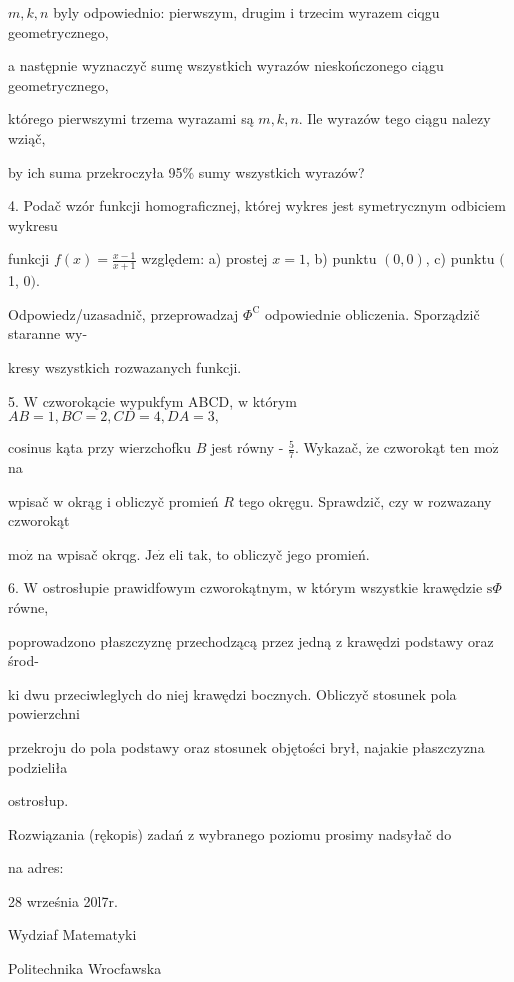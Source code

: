 \documentclass[a4paper,12pt]{article}
\begin{document}
$m, k, n$ byly odpowiednio: pierwszym, drugim $\mathrm{i}$ trzecim wyrazem ciqgu geometrycznego,

a następnie wyznaczyč sumę wszystkich wyrazów nieskończonego ciągu geometrycznego,

którego pierwszymi trzema wyrazami są $m, k, n$. Ile wyrazów tego ciągu nalezy wziąč,

by ich suma przekroczyła 95\% sumy wszystkich wyrazów?

4. Podač wzór funkcji homograficznej, której wykres jest symetrycznym odbiciem wykresu

funkcji $f(x)=\displaystyle \frac{x-1}{x+1}$ względem: a) prostej $x=1$, b) punktu $(0,0)$, c) punktu $($1, $0).$

Odpowiedz/uzasadnič, przeprowadzaj $\Phi^{\mathrm{C}}$ odpowiednie obliczenia. Sporządzič staranne wy-

kresy wszystkich rozwazanych funkcji.

5. $\mathrm{W}$ czworokącie wypukfym ABCD, $\mathrm{w}$ którym $AB= 1, BC = 2, CD = 4, DA = 3,$

cosinus kąta przy wierzchofku $B$ jest równy - $\displaystyle \frac{5}{7}$. Wykazač, $\dot{\mathrm{z}}\mathrm{e}$ czworokąt ten $\mathrm{m}\mathrm{o}\dot{\mathrm{z}}$ na

wpisač $\mathrm{w}$ okrąg $\mathrm{i}$ obliczyč promień $R$ tego okręgu. Sprawdzič, czy $\mathrm{w}$ rozwazany czworokąt

$\mathrm{m}\mathrm{o}\dot{\mathrm{z}}$ na wpisač okrqg. $\mathrm{J}\mathrm{e}\dot{\mathrm{z}}$ eli $\mathrm{t}\mathrm{a}\mathrm{k}$, to obliczyč jego promień.

6. $\mathrm{W}$ ostrosłupie prawidfowym czworokątnym, $\mathrm{w}$ którym wszystkie krawędzie $\mathrm{s}\Phi$ równe,

poprowadzono płaszczyznę przechodzącą przez jedną $\mathrm{z}$ krawędzi podstawy oraz środ-

ki dwu przeciwleglych do niej krawędzi bocznych. Obliczyč stosunek pola powierzchni

przekroju do pola podstawy oraz stosunek objętości brył, najakie płaszczyzna podzieliła

ostrosłup.

Rozwiązania (rękopis) zadań z wybranego poziomu prosimy nadsyłač do

na adres:

28 września 20l7r.

Wydziaf Matematyki

Politechnika Wrocfawska
\end{document}
